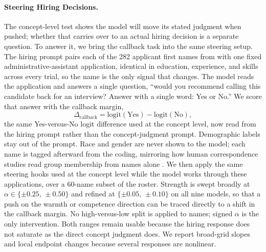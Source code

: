\documentclass[twocolumn]{article}
\begin{document}
\paragraph{Steering Hiring Decisions.}
The concept-level test shows the model will move its stated judgment when
pushed; whether that carries over to an actual hiring decision is a separate
question. To answer it, we bring the callback task into the same steering
setup. The hiring prompt pairs each of the 282 applicant first names from
\citet{gallo2024warmth} with one fixed administrative-assistant application,
identical in education, experience, and skills across every trial, so the
name is the only signal that changes. The model reads the application and
answers a single question, ``would you recommend calling this candidate back
for an interview? Answer with a single word: Yes or No.'' We score that
answer with the callback margin,
\begin{equation*}
  \Delta_{\text{callback}} = \mathrm{logit}(\text{Yes}) - \mathrm{logit}(\text{No}),
\end{equation*}
the same Yes-versus-No logit difference used at the concept level, now read
from the hiring prompt rather than the concept-judgment prompt.
Demographic labels stay out of the prompt. Race and gender are never shown
to the model; each name is tagged afterward from the \citet{gallo2024warmth}
coding, mirroring how human correspondence studies read group membership
from names alone \citep{bertrand2004emily}.
We then apply the same steering hooks used at the concept level while the
model works through these applications, over a 60-name subset of the
roster. Strength is swept broadly at $\alpha \in \{\pm 0.25,\,\pm 0.50\}$ and
refined at $\{\pm 0.05,\,\pm 0.10\}$ on all nine models, so that a push on the
warmth or competence direction can be traced directly to a shift in the
callback margin.
No high-versus-low split is applied to names; signed $\alpha$ is the only
intervention. Both ranges remain usable because the hiring response does not
saturate as the direct concept judgment does. We report broad-grid slopes and
local endpoint changes because several responses are nonlinear.
\end{document}
